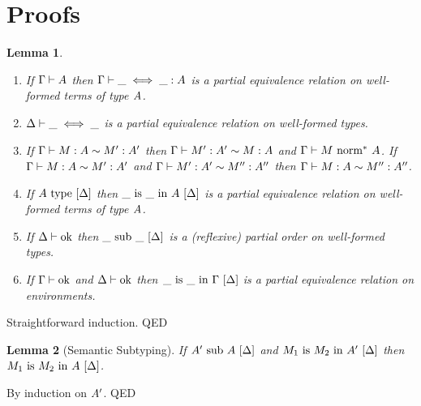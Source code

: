 \documentclass{article}
\theoremstyle{break}
\newtheorem{lemma}{Lemma}
\newcommand{\qed}{\mbox{QED}}
\newenvironment{proof}{\noindent{\bf Proof:}\hspace*{0.5em}}{\hspace*{\fill}\qed}
\begin{document}
\section{Proofs}

\begin{lemma}
\label{lemma:PER}
\begin{enumerate}
\item If $\Gamma\vdash A$ then
$\Gamma\vdash \_ \iff \_ : A$ is a partial equivalence relation
on well-formed terms of type $A$.
\item $\Delta\vdash \_ \iff \_$ is a partial equivalence relation
on well-formed types.
\item If $\Gamma\vdash M : A \sim M' : A'$ then
$\Gamma\vdash M' : A' \sim M : A$ and
${\Gamma}\vdash{M}\mbox{\ norm}^*\ {A}$.  If 
$\Gamma\vdash M : A \sim M' : A'$ and
$\Gamma\vdash M' : A' \sim M'' : A''$ then
$\Gamma\vdash M : A \sim M'' : A''$.
\item If ${A}\mathrm{\ type\ }[\Delta]$ then
${\_}\mathrm{\ is\ }{\_}\mathrm{\ in\ }{A}\ [\Delta]$ is a partial equivalence relation
on well-formed terms of type $A$.
\item If ${\Delta}\vdash\mbox{ok}$ then
${\_}\mathrm{\ sub\ }{\_}\ [\Delta]$ is a (reflexive) partial order on
well-formed types.
\item If ${\Gamma}\vdash\mbox{ok}$ and ${\Delta}\vdash\mbox{ok}$ then
${\_}\mathrm{\ is\ }{\_}\mathrm{\ in\ }{\Gamma}\ [\Delta]$ is a partial equivalence relation
on environments.
\end{enumerate}
\end{lemma}

\begin{proof}
Straightforward induction.
\end{proof}

\begin{lemma}[Semantic Subtyping]
\label{lemma:semanticsub}
If ${A'}\mathrm{\ sub\ }{A}\ [\Delta]$ and
${M_1}\mathrm{\ is\ }{M_2}\mathrm{\ in\ }{A'}\ [\Delta]$ then
${M_1}\mathrm{\ is\ }{M_2}\mathrm{\ in\ }{A}\ [\Delta]$.
\end{lemma}

\begin{proof}
By induction on $A'$.
\end{proof}
\end{document}
